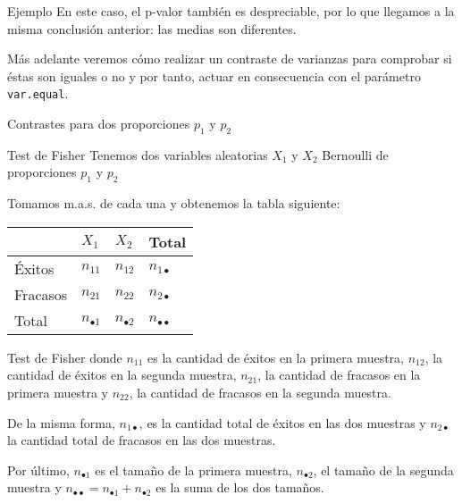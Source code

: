 \documentclass[
  ignorenonframetext,
]{beamer}
\begin{document}
\begin{frame}[fragile]{Ejemplo}
\protect\hypertarget{ejemplo-6}{}
En este caso, el p-valor también es despreciable, por lo que llegamos a
la misma conclusión anterior: las medias son diferentes.

Más adelante veremos cómo realizar un contraste de varianzas para
comprobar si éstas son iguales o no y por tanto, actuar en consecuencia
con el parámetro \texttt{var.equal}.
\end{frame}

\begin{frame}{Contrastes para dos proporciones \(p_1\) y \(p_2\)}
\protect\hypertarget{contrastes-para-dos-proporciones-p_1-y-p_2}{}
\end{frame}

\begin{frame}{Test de Fisher}
\protect\hypertarget{test-de-fisher}{}
Tenemos dos variables aleatorias \(X_1\) y \(X_2\) Bernoulli de
proporciones \(p_1\) y \(p_2\)

Tomamos m.a.s. de cada una y obtenemos la tabla siguiente:

\begin{longtable}[]{@{}llll@{}}
\toprule
& \(X_1\) & \(X_2\) & Total\tabularnewline
\midrule
\endhead
Éxitos & \(n_{11}\) & \(n_{12}\) & \(n_{1\bullet}\)\tabularnewline
Fracasos & \(n_{21}\) & \(n_{22}\) & \(n_{2\bullet}\)\tabularnewline
Total & \(n_{\bullet 1}\) & \(n_{\bullet 2}\) &
\(n_{\bullet\bullet}\)\tabularnewline
\bottomrule
\end{longtable}
\end{frame}

\begin{frame}{Test de Fisher}
\protect\hypertarget{test-de-fisher-1}{}
donde \(n_{11}\) es la cantidad de éxitos en la primera muestra,
\(n_{12}\), la cantidad de éxitos en la segunda muestra, \(n_{21}\), la
cantidad de fracasos en la primera muestra y \(n_{22}\), la cantidad de
fracasos en la segunda muestra.

De la misma forma, \(n_{1\bullet}\), es la cantidad total de éxitos en
las dos muestras y \(n_{2\bullet}\) la cantidad total de fracasos en las
dos muestras.

Por último, \(n_{\bullet 1}\) es el tamaño de la primera muestra,
\(n_{\bullet 2}\), el tamaño de la segunda muestra y
\(n_{\bullet\bullet}=n_{\bullet 1}+n_{\bullet 2}\) es la suma de los dos
tamaños.
\end{frame}
\end{document}
